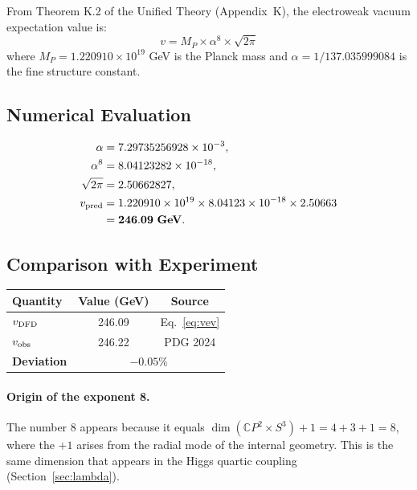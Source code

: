 \documentclass[11pt]{article}
\theoremstyle{definition}
\begin{document}
From Theorem K.2 of the Unified Theory (Appendix~K), the electroweak
vacuum expectation value is:
\begin{equation}\label{eq:vev}
\boxed{v = M_P \times \alpha^8 \times \sqrt{2\pi}}
\end{equation}
where $M_P = 1.220910 \times 10^{19}$ GeV is the Planck mass and
$\alpha = 1/137.035999084$ is the fine structure constant.

\subsection{Numerical Evaluation}

\begin{align}
\alpha &= 7.29735256928 \times 10^{-3}, \\
\alpha^8 &= 8.04123282 \times 10^{-18}, \\
\sqrt{2\pi} &= 2.50662827, \\
v_{\rm pred} &= 1.220910 \times 10^{19} \times 8.04123 \times 10^{-18}
               \times 2.50663 \notag \\
             &= \mathbf{246.09~\textbf{GeV}}.
\end{align}

\subsection{Comparison with Experiment}

\begin{center}
\renewcommand{\arraystretch}{1.3}
\begin{tabular}{lcc}
\toprule
Quantity & Value (GeV) & Source \\
\midrule
$v_{\rm DFD}$ & 246.09 & Eq.~\eqref{eq:vev} \\
$v_{\rm obs}$ & 246.22 & PDG 2024 \\
\midrule
\textbf{Deviation} & \multicolumn{2}{c}{\textbf{$-0.05\%$}} \\
\bottomrule
\end{tabular}
\end{center}

\paragraph{Origin of the exponent 8.}
The number 8 appears because it equals
$\dim(\mathbb{C}P^2 \times S^3) + 1 = 4 + 3 + 1 = 8$,
where the $+1$ arises from the radial mode of the internal geometry.
This is the same dimension that appears in the Higgs quartic coupling
(Section~\ref{sec:lambda}).
\end{document}
